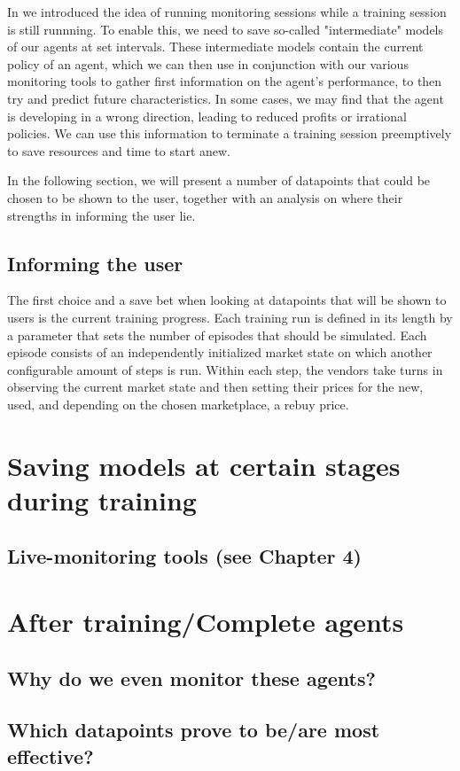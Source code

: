 In  we introduced the idea of running monitoring sessions while a training session is still runnning. To enable this, we need to save so-called "intermediate" models of our agents at set intervals. These intermediate models contain the current policy of an agent, which we can then use in conjunction with our various monitoring tools to gather first information on the agent's performance, to then try and predict future characteristics. In some cases, we may find that the agent is developing in a wrong direction, leading to reduced profits or irrational policies. We can use this information to terminate a training session preemptively to save resources and time to start anew. 

In the following section, we will present a number of datapoints that could be chosen to be shown to the user, together with an analysis on where their strengths in informing the user lie.

\subsection{Informing the user}

The first choice and a save bet when looking at datapoints that will be shown to users is the current training progress. Each training run is defined in its length by a parameter that sets the number of episodes that should be simulated. Each episode consists of an independently initialized market state on which another configurable amount of steps is run. Within each step, the vendors take turns in observing the current market state and then setting their prices for the new, used, and depending on the chosen marketplace, a rebuy price. 

\section{Saving models at certain stages during training}
\subsection{Live-monitoring tools (see Chapter 4)}

\section{After training/Complete agents}
\subsection{Why do we even monitor these agents?}
\subsection{Which datapoints prove to be/are most effective?}